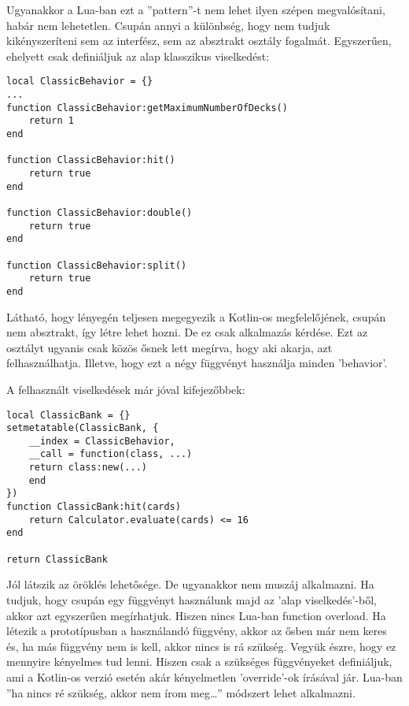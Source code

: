 \newpage

Ugyanakkor a Lua-ban ezt a ''pattern''-t nem lehet ilyen szépen megvalósítani, habár nem lehetetlen. Csupán annyi a különbség, hogy nem tudjuk kikényszeríteni sem az interfész, sem az absztrakt osztály fogalmát. Egyszerűen, ehelyett csak definiáljuk az alap klasszikus viselkedést:
\scriptsize
\begin{lstlisting}[style=Lua]
local ClassicBehavior = {}
...
function ClassicBehavior:getMaximumNumberOfDecks()
	return 1
end

function ClassicBehavior:hit()
	return true
end

function ClassicBehavior:double()
	return true
end

function ClassicBehavior:split()
	return true
end
\end{lstlisting}
\normalsize
Látható, hogy lényegén teljesen megegyezik a Kotlin-os megfelelőjének, csupán nem absztrakt, így létre lehet hozni. De ez csak alkalmazás kérdése. Ezt az osztályt ugyanis csak közös ősnek lett megírva, hogy aki akarja, azt felhasználhatja. Illetve, hogy ezt a négy függvényt használja minden 'behavior'.

A felhasznált viselkedések már jóval kifejezőbbek:
\scriptsize
\begin{lstlisting}[style=Lua]
local ClassicBank = {}
setmetatable(ClassicBank, {
	__index = ClassicBehavior,
	__call = function(class, ...)
	return class:new(...)
	end
})
function ClassicBank:hit(cards)
	return Calculator.evaluate(cards) <= 16
end

return ClassicBank
\end{lstlisting}
\normalsize
Jól látszik az öröklés lehetősége. De ugyanakkor nem muszáj alkalmazni. Ha tudjuk, hogy csupán egy függvényt használunk majd az 'alap viselkedés'-ből, akkor azt egyszerűen megírhatjuk. Hiszen nincs Lua-ban function overload. Ha létezik a prototípusban a használandó függvény, akkor az ősben már nem keres és, ha más függvény nem is kell, akkor nincs is rá szükség. Vegyük észre, hogy ez mennyire kényelmes tud lenni. Hiszen csak a szükséges függvényeket definiáljuk, ami a Kotlin-os verzió esetén akár kényelmetlen 'override'-ok írásával jár. Lua-ban ''ha nincs ré szükség, akkor nem írom meg\dots'' módszert lehet alkalmazni.

\newpage

